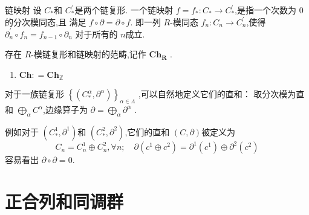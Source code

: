 \documentclass[../../几何与拓扑.tex]{subfiles}
\begin{document}
\begin{definition}{链映射}
    设 \(  C_{*}  \)和 \(  C_{*}^{\prime}   \)是两个链复形.
    一个链映射 \(  f= f_{*}: C_{*}\to C_{*}^{\prime}   \),是指一个次数为 \(  0  \)的分次模同态,且 满足 \(  f\circ \partial  =  \partial \circ f  \).
    即一列 \(  R  \)-模同态 \(  f_{n}:C_{n}\to C_{n}^{\prime}   \),使得 \(  \partial _{n}^{\prime} \circ f_{n} =  f_{n-1}\circ \partial _{n}  \)  对于所有的 \(  n  \)成立.   
\end{definition}

\begin{proposition}
    存在 \(  R  \)-模链复形和链映射的范畴,记作 \(  \mathbf{Ch_R}  \)  .
\end{proposition}
\begin{remark}
    \begin{enumerate}
        \item \(  \mathbf{Ch}: =  \mathbf{Ch}_{\mathbb{Z} }  \) 
    \end{enumerate}
    
\end{remark}

\begin{definition}
    对于一族链复形 \(  \left\{ \left( C^{\alpha }_{*},\partial ^{\alpha } \right)  \right\}  _{\alpha \in  \Lambda }\) ,可以自然地定义它们的直和：
    取分次模为直和 \(  \bigoplus _{\alpha }C^{\alpha }  \),边缘算子为 \(  \partial  =  \bigoplus _{\alpha }\partial ^{\alpha }  \)  .
\end{definition}

\begin{example}例如对于 \(  \left( C^{1}_{*},\partial ^{1} \right)   \)和 \( \left( C^{2}_{*}, \partial ^{2} \right)  \),它们的直和 \(  \left( C,\partial  \right)   \)被定义为 \[
C_{n} =  C_{n}^{1} \oplus C_{n}^{2},\forall n; \quad  \partial \left( c^{1} \oplus c^{2} \right)=  \partial ^{1}\left( c^{1} \right) \oplus  \partial ^{2}\left( c^{2} \right)   
\]   容易看出 \(  \partial \circ \partial  =  0  \). 
    
\end{example}

\hspace*{\fill} 

\section{正合列和同调群}
\end{document}
